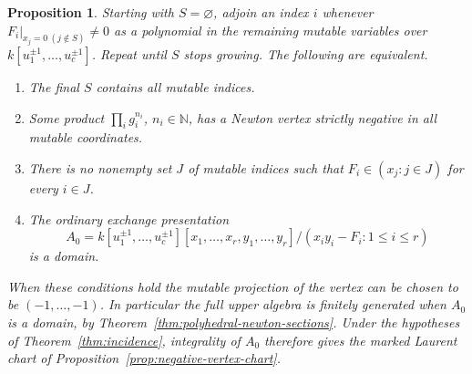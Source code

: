 \documentclass[11pt,reqno]{amsart}
\numberwithin{equation}{section}
\newtheorem{proposition}[theorem]{Proposition}
\theoremstyle{definition}
\theoremstyle{remark}
\begin{document}
\begin{proposition}\label{prop:seed-negative-vertex}
Starting with \(S=\varnothing\), adjoin an index \(i\) whenever
\(F_i\big|_{x_j=0\ (j\notin S)}\ne0\) as a polynomial in the remaining mutable variables over
\(k[u_1^{\pm1},\ldots,u_c^{\pm1}]\). Repeat until \(S\) stops
growing. The following are equivalent.
\begin{enumerate}
\item The final \(S\) contains all mutable indices.
\item Some product \(\prod_i g_i^{n_i}\), \(n_i\in\mathbb N\), has
a Newton vertex strictly negative in all mutable coordinates.
\item There is no nonempty set \(J\) of mutable indices such that
\(F_i\in(x_j:j\in J)\) for every \(i\in J\).
\item The ordinary exchange presentation
\[ A_0=k[u_1^{\pm1},\ldots,u_c^{\pm1}][x_1,\ldots,x_r,y_1,\ldots,y_r]/ (x_i y_i-F_i:1\le i\le r) \]
is a domain.
\end{enumerate}
When these conditions hold the mutable projection of the vertex
can be chosen to be \((-1,\ldots,-1)\). In particular the full upper
algebra is finitely generated when \(A_0\) is a domain, by
Theorem~\ref{thm:polyhedral-newton-sections}.
Under the hypotheses of Theorem~\ref{thm:incidence}, integrality of
\(A_0\) therefore gives the marked Laurent chart of
Proposition~\ref{prop:negative-vertex-chart}.
\end{proposition}
\end{document}
